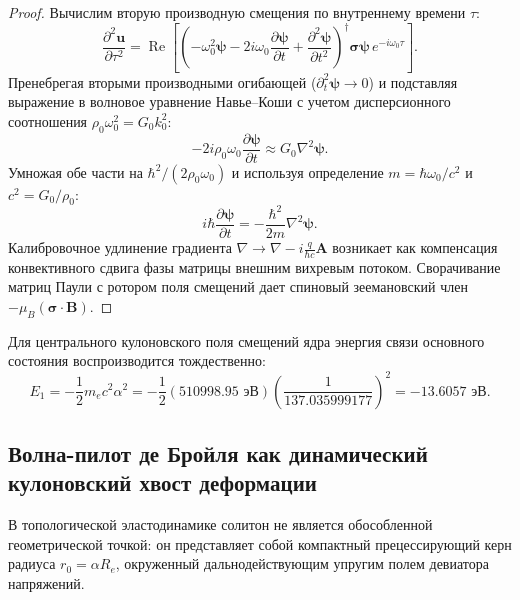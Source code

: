 \documentclass[11pt,a4paper]{article}
\theoremstyle{definition}
\theoremstyle{remark}
\begin{document}
\begin{proof}
Вычислим вторую производную смещения по внутреннему времени $\tau$:
\begin{equation}
    \frac{\partial^2 \mathbf{u}}{\partial \tau^2} = \operatorname{Re}\left[ \left( -\omega_0^2 \boldsymbol{\psi} - 2i \omega_0 \frac{\partial \boldsymbol{\psi}}{\partial t} + \frac{\partial^2 \boldsymbol{\psi}}{\partial t^2} \right)^\dagger \boldsymbol{\sigma} \boldsymbol{\psi} \, e^{-i\omega_0 \tau} \right].
\end{equation}
Пренебрегая вторыми производными огибающей ($\partial_t^2 \boldsymbol{\psi} \to 0$) и подставляя выражение в волновое уравнение Навье--Коши с учетом дисперсионного соотношения $\rho_0 \omega_0^2 = G_0 k_0^2$:
\begin{equation}
    -2i \rho_0 \omega_0 \frac{\partial \boldsymbol{\psi}}{\partial t} \approx G_0 \nabla^2 \boldsymbol{\psi}.
\end{equation}
Умножая обе части на $\hbar^2 / (2 \rho_0 \omega_0)$ и используя определение $m = \hbar \omega_0 / c^2$ и $c^2 = G_0 / \rho_0$:
\begin{equation}
    i \hbar \frac{\partial \boldsymbol{\psi}}{\partial t} = -\frac{\hbar^2}{2m} \nabla^2 \boldsymbol{\psi}.
\end{equation}
Калибровочное удлинение градиента $\nabla \to \nabla - i\frac{q}{\hbar c}\mathbf{A}$ возникает как компенсация конвективного сдвига фазы матрицы внешним вихревым потоком. Сворачивание матриц Паули с ротором поля смещений дает спиновый зеемановский член $-\mu_B (\boldsymbol{\sigma}\cdot\mathbf{B})$.
\end{proof}

Для центрального кулоновского поля смещений ядра энергия связи основного состояния воспроизводится тождественно:
\begin{equation}
    E_1 = -\frac{1}{2} m_e c^2 \alpha^2 = -\frac{1}{2} (510998.95\text{ эВ}) \left( \frac{1}{137.035999177} \right)^2 = \mathbf{-13.6057\text{ эВ}}.
\end{equation}

\subsection{Волна-пилот де Бройля как динамический кулоновский хвост деформации}
В топологической эластодинамике солитон не является обособленной геометрической точкой: он представляет собой компактный прецессирующий керн радиуса $r_0 = \alpha R_e$, окруженный дальнодействующим упругим полем девиатора напряжений.
\end{document}
